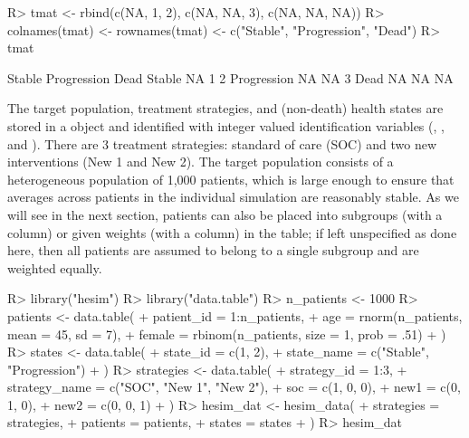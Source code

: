 \documentclass[article, nojss]{jss}\usepackage[]{graphicx}\usepackage[]{color}
\begin{document}
\begin{Schunk}
\begin{Sinput}
R> tmat <- rbind(c(NA, 1, 2), c(NA, NA, 3), c(NA, NA, NA))
R> colnames(tmat) <- rownames(tmat) <- c("Stable", "Progression", "Dead")
R> tmat
\end{Sinput}
\begin{Soutput}
            Stable Progression Dead
Stable          NA           1    2
Progression     NA          NA    3
Dead            NA          NA   NA
\end{Soutput}
\end{Schunk}

The target population, treatment strategies, and (non-death) health states are stored in a  object and identified with integer valued identification variables (, , and ). There are 3 treatment strategies: standard of care (SOC) and two new interventions (New 1 and New 2). The target population consists of a heterogeneous population of 1,000 patients, which is large enough to ensure that averages across patients in the individual simulation are reasonably stable. As we will see in the next section, patients can also be placed into subgroups (with a  column) or given weights (with a  column) in the  table; if left unspecified as done here, then all patients are assumed to belong to a single subgroup and are weighted equally.

\begin{Schunk}
\begin{Sinput}
R> library("hesim")
R> library("data.table")
R> n_patients <- 1000
R> patients <- data.table(
+    patient_id = 1:n_patients,
+    age = rnorm(n_patients, mean = 45, sd = 7),
+    female = rbinom(n_patients, size = 1, prob = .51)
+  )
R> states <- data.table(
+    state_id = c(1, 2),
+    state_name = c("Stable", "Progression") 
+  )
R> strategies <- data.table(
+    strategy_id = 1:3,
+    strategy_name = c("SOC", "New 1", "New 2"),
+    soc = c(1, 0, 0),
+    new1 = c(0, 1, 0),
+    new2 = c(0, 0, 1)
+  )
R> hesim_dat <- hesim_data(
+    strategies = strategies,
+    patients = patients,
+    states = states
+  )
R> hesim_dat
\end{Sinput}
\end{Schunk}
\end{document}
